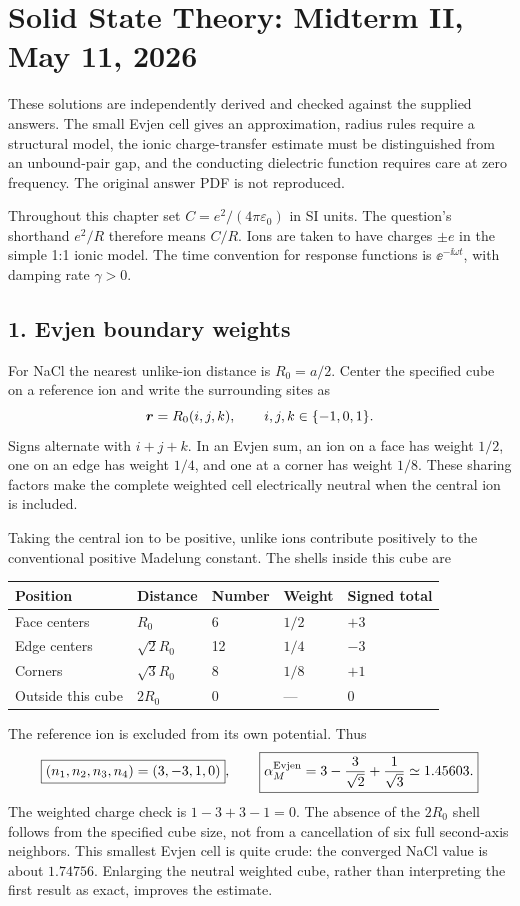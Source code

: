 \chapter{Solid State Theory: Midterm II, May 11, 2026}
\label{s:theory-2026-05-midterm-ii}
\begin{sourceNote}
These solutions are independently derived and checked against the supplied answers. The small Evjen cell gives an approximation, radius rules require a structural model, the ionic charge-transfer estimate must be distinguished from an unbound-pair gap, and the conducting dielectric function requires care at zero frequency. The original answer PDF is not reproduced.
\end{sourceNote}
Throughout this chapter set $C=e^2/(4\pi\varepsilon_0)$ in SI units. The question's shorthand $e^2/R$ therefore means $C/R$. Ions are taken to have charges $\pm e$ in the simple 1:1 ionic model. The time convention for response functions is $\ee^{-\ii\omega t}$, with damping rate $\gamma>0$.

\section*{1. Evjen boundary weights}
For NaCl the nearest unlike-ion distance is $R_0=a/2$. Center the specified cube on a reference ion and write the surrounding sites as
\[
\boldsymbol{r}=R_0(i,j,k),\qquad i,j,k\in\{-1,0,1\}.
\]
Signs alternate with $i+j+k$. In an Evjen sum, an ion on a face has weight $1/2$, one on an edge has weight $1/4$, and one at a corner has weight $1/8$. These sharing factors make the complete weighted cell electrically neutral when the central ion is included.

Taking the central ion to be positive, unlike ions contribute positively to the conventional positive Madelung constant. The shells inside this cube are
\begin{center}
\begin{tabular}{lllll}
\toprule
Position & Distance & Number & Weight & Signed total\\
\midrule
Face centers & $R_0$ & 6 & $1/2$ & $+3$\\
Edge centers & $\sqrt2R_0$ & 12 & $1/4$ & $-3$\\
Corners & $\sqrt3R_0$ & 8 & $1/8$ & $+1$\\
Outside this cube & $2R_0$ & 0 & --- & $0$\\
\bottomrule
\end{tabular}
\end{center}
The reference ion is excluded from its own potential. Thus
\[
\boxed{(n_1,n_2,n_3,n_4)=(3,-3,1,0)},\qquad
\boxed{\alpha_M^{\rm Evjen}=3-\frac3{\sqrt2}+\frac1{\sqrt3}\simeq1.45603.}
\]
The weighted charge check is $1-3+3-1=0$. The absence of the $2R_0$ shell follows from the specified cube size, not from a cancellation of six full second-axis neighbors. This smallest Evjen cell is quite crude: the converged NaCl value is about $1.74756$. Enlarging the neutral weighted cube, rather than interpreting the first result as exact, improves the estimate.

